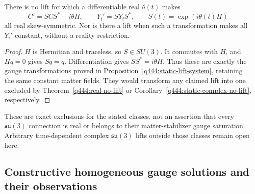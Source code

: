 \begin{corollary}
\label{q444:real-stabilizer-no-lift}
There is no lift for which a differentiable real $\theta(t)$ makes
\[
 C'=SCS^*-i\dot\theta H,\qquad Y_i'=SY_iS^*,\qquad
 S(t)=\exp(i\theta(t)H)
\]
all real skew-symmetric. Nor is there a lift when such a transformation
makes all $Y_i'$ constant, without a reality restriction.
\end{corollary}
\begin{proof}
$H$ is Hermitian and traceless, so $S\in SU(3)$.
It commutes with $H$, and $Hq=0$ gives $Sq=q$.
Differentiation gives $\dot SS^*=i\dot\theta H$.
Thus these are exactly the gauge transformations proved in
Proposition~\ref{q444:static-lift-system}, retaining the same constant
matter fields. They would transform any claimed lift into one excluded
by Theorem~\ref{q444:real-no-lift} or
Corollary~\ref{q444:static-complex-no-lift}, respectively.
\end{proof}

These are exact exclusions for the stated classes, not an assertion
that every $\mathfrak{su}(3)$ connection is real or belongs to their
matter-stabilizer gauge saturation. Arbitrary time-dependent complex
$\mathfrak{su}(3)$ lifts outside those classes remain open here.

\subsection{Constructive homogeneous gauge solutions and their observations}

